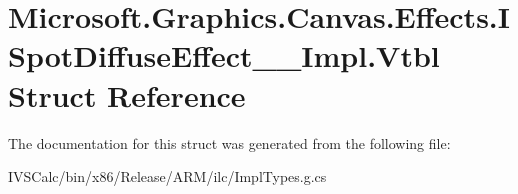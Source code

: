 \hypertarget{struct_microsoft_1_1_graphics_1_1_canvas_1_1_effects_1_1_i_spot_diffuse_effect_____impl_1_1_vtbl}{}\section{Microsoft.\+Graphics.\+Canvas.\+Effects.\+I\+Spot\+Diffuse\+Effect\+\_\+\+\_\+\+Impl.\+Vtbl Struct Reference}
\label{struct_microsoft_1_1_graphics_1_1_canvas_1_1_effects_1_1_i_spot_diffuse_effect_____impl_1_1_vtbl}


The documentation for this struct was generated from the following file\+:\begin{DoxyCompactItemize}
\item 
I\+V\+S\+Calc/bin/x86/\+Release/\+A\+R\+M/ilc/Impl\+Types.\+g.\+cs\end{DoxyCompactItemize}
